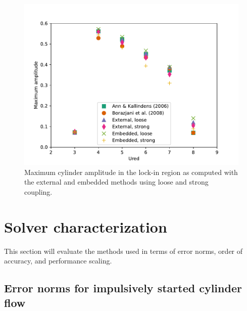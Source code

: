 \documentclass[preprint,12pt]{elsarticle}
\begin{document}
\begin{figure}[htbp]
    \centering
    \includegraphics[width=\textwidth]{VIV_combine}
    \caption{Maximum cylinder amplitude in the lock-in region as computed with the
    external and embedded methods using loose and strong coupling.}
    \label{fig:viv_combine}
\end{figure}

\section{Solver characterization}
\label{chapter:error}

This section will evaluate the methods used in terms of error norms, order of accuracy,
and performance scaling.


\subsection{Error norms for impulsively started cylinder flow}
\end{document}
